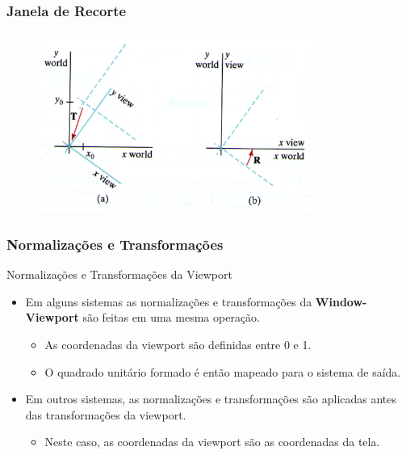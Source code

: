 \documentclass{beamer}
\begin{document}
\begin{frame}
\frametitle{Janela de Recorte}

	\begin{figure}[!h]
				\begin{center}
					\includegraphics[width=0.8\textwidth]{Figures/WcVc}
				\end{center}
			\end{figure}	
\end{frame}

\begin{frame}
\frametitle{Normalizações e Transformações }

	\begin{block}{Normalizações e Transformações da Viewport}
		\begin{itemize}
			\item Em alguns sistemas as normalizações e transformações da \textbf{Window-Viewport} são feitas em uma mesma operação.
			\begin{itemize}
				\item As coordenadas da viewport são definidas entre 0 e 1.
				\item O quadrado unitário formado é então mapeado para o sistema de saída.
			\end{itemize}
			
			\item Em outros sistemas, as normalizações e transformações são aplicadas antes das transformações da viewport.
			\begin{itemize}
				\item Neste caso, as coordenadas da viewport são as coordenadas da tela.
			\end{itemize}					 
		\end{itemize}
		
	\end{block}
\end{frame}
\end{document}
